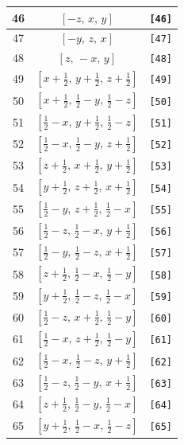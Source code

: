 \documentclass[fleqn,8pt]{jsarticle}
\begin{document}
\begin{longtable}{ccc}
46 & $\left[ - z,\, x,\, y \right]$ & {\tt [46]} \\ \hline
47 & $\left[ - y,\, z,\, x \right]$ & {\tt [47]} \\ \hline
48 & $\left[ z,\, - x,\, y \right]$ & {\tt [48]} \\ \hline
49 & $\left[ x + \frac{1}{2},\, y + \frac{1}{2},\, z + \frac{1}{2} \right]$ & {\tt [49]} \\ \hline
50 & $\left[ x + \frac{1}{2},\, \frac{1}{2} - y,\, \frac{1}{2} - z \right]$ & {\tt [50]} \\ \hline
51 & $\left[ \frac{1}{2} - x,\, y + \frac{1}{2},\, \frac{1}{2} - z \right]$ & {\tt [51]} \\ \hline
52 & $\left[ \frac{1}{2} - x,\, \frac{1}{2} - y,\, z + \frac{1}{2} \right]$ & {\tt [52]} \\ \hline
53 & $\left[ z + \frac{1}{2},\, x + \frac{1}{2},\, y + \frac{1}{2} \right]$ & {\tt [53]} \\ \hline
54 & $\left[ y + \frac{1}{2},\, z + \frac{1}{2},\, x + \frac{1}{2} \right]$ & {\tt [54]} \\ \hline
55 & $\left[ \frac{1}{2} - y,\, z + \frac{1}{2},\, \frac{1}{2} - x \right]$ & {\tt [55]} \\ \hline
56 & $\left[ \frac{1}{2} - z,\, \frac{1}{2} - x,\, y + \frac{1}{2} \right]$ & {\tt [56]} \\ \hline
57 & $\left[ \frac{1}{2} - y,\, \frac{1}{2} - z,\, x + \frac{1}{2} \right]$ & {\tt [57]} \\ \hline
58 & $\left[ z + \frac{1}{2},\, \frac{1}{2} - x,\, \frac{1}{2} - y \right]$ & {\tt [58]} \\ \hline
59 & $\left[ y + \frac{1}{2},\, \frac{1}{2} - z,\, \frac{1}{2} - x \right]$ & {\tt [59]} \\ \hline
60 & $\left[ \frac{1}{2} - z,\, x + \frac{1}{2},\, \frac{1}{2} - y \right]$ & {\tt [60]} \\ \hline
61 & $\left[ \frac{1}{2} - x,\, z + \frac{1}{2},\, \frac{1}{2} - y \right]$ & {\tt [61]} \\ \hline
62 & $\left[ \frac{1}{2} - x,\, \frac{1}{2} - z,\, y + \frac{1}{2} \right]$ & {\tt [62]} \\ \hline
63 & $\left[ \frac{1}{2} - z,\, \frac{1}{2} - y,\, x + \frac{1}{2} \right]$ & {\tt [63]} \\ \hline
64 & $\left[ z + \frac{1}{2},\, \frac{1}{2} - y,\, \frac{1}{2} - x \right]$ & {\tt [64]} \\ \hline
65 & $\left[ y + \frac{1}{2},\, \frac{1}{2} - x,\, \frac{1}{2} - z \right]$ & {\tt [65]} \\ \hline

\end{longtable}
\end{document}
